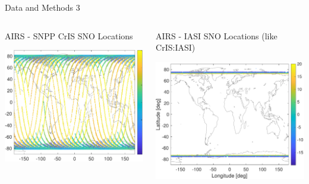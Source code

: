 \documentclass[10pt,t]{beamer}
\begin{document}
\begin{frame}[label={sec:org86a7258}]{Data and Methods 3}
\vspace{-0.2in}
\begin{columns}
\begin{column}{0.55\columnwidth}
\begin{block}{\footnotesize AIRS - SNPP CrIS SNO Locations}
\begin{center}
\includegraphics[width=0.95\linewidth]{./Figs/ac_global_delay_map.pdf}
\end{center}
\end{block}
\end{column}

\begin{column}{0.55\columnwidth}
\begin{block}{\footnotesize AIRS - IASI SNO Locations (like CrIS:IASI)}
\begin{center}
\includegraphics[width=0.95\linewidth]{./Figs/ai_global_delay_map.pdf}
\end{center}
\end{block}
\end{column}
\end{columns}
\end{frame}
\end{document}
